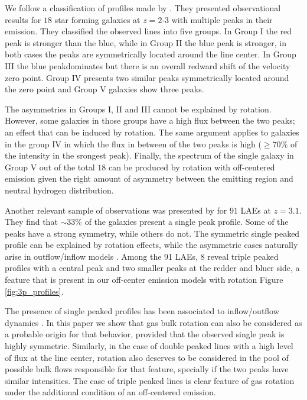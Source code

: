 \documentclass{emulateapj}
\newcommand{\ly}{{\ifmmode{{\rm Ly}\alpha~}\else{Ly$\alpha$~}\fi}}
\begin{document}
We follow a classification of \ly profiles made by
\cite{Kulas12}. They presented observational results for $18$ star forming
galaxies at $z=2$-$3$ with multiple peaks in their \ly emission.
They classified the observed lines into five groups. In Group I the
red peak is stronger than the blue, while in Group II the blue peak is
stronger, in both cases the peaks are symmetrically located around the
line center. In Group III the blue peakdominates but there is an
overall redward shift of the velocity zero point. Group IV presents two similar
peaks symmetrically located around the zero point and Group V galaxies show
three peaks. 

The asymmetries in Groups I, II  and III cannot be explained by
rotation. However, some galaxies in those groups have a high flux between
the two peaks; an effect that can be induced by rotation. The same
argument applies to galaxies in the group IV in which the flux
in between of the two peaks is high ($ \geq 70 \%$ of the intensity in
the srongest peak). Finally, the spectrum of the single galaxy in
Group V out of the total $18$ can be produced by rotation with
off-centered emission given the right amount of asymmetry between the
emitting region and neutral hydrogen distribution. 

Another relevant sample of observations was presented by \cite{Yamada2012} 
for $91$ LAEs at $z=3.1$. They find that $\sim 33 \%$ of the galaxies present 
a single peak profile. Some of the peaks have a strong symmetry, while
others do not. The symmetric single peaked profile can be explained by
rotation effects, while the asymmetric cases naturally arise in
outflow/inflow models \citep{Verhamme2008, Dijkstra06}. Among the 91
LAEs, 8 reveal triple peaked profiles with a central peak and two
smaller peaks at the redder and bluer side, a feature that is present
in our off-center emission models with rotation Figure \ref{fig:3p_profiles}. 

The presence of single peaked profiles has been associated to
inflow/outflow dynamics \citep{XXX}. In this paper we show that gas
bulk rotation can also be considered as a probable origin for that
behavior, provided that the observed single peak is highly
symmetric. Similarly, in the case of double peaked lines with a high
level of flux at the line center, rotation also deserves to be considered in
the pool of possible bulk flows responsible for that feature,
specially if the two peaks have similar intensities. The case of
triple peaked lines is clear feature of gas rotation under the
additional condition of an off-centered emission.  
\end{document}
